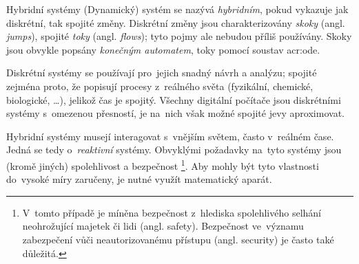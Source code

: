 \documentclass[thesis=M,czech]{FITthesis}[2012/06/26]
\newcommand{\acrlabel}[1]{acr:#1}
\newcommand{\acr}[1]{\acrshort{\acrlabel{#1}}}
\newcommand{\hl}[1]{\textit{#1}}
\newcommand{\name}[1]{\hl{#1}}
\newcommand{\rf}[1]{\ref{#1}}
\newcommand{\picFn}[1]{../img/#1}
\newcommand{\picL}{pic}
\newcommand{\rfPic}[1]{(\rf{\picL:#1})}
\newcommand{\pic}[5]{
\begin{figure}
{\centering
\texttt{[image: \\picFn\{\#1]}}
\caption{#4}
\label{\picL:#2}
}\smallskip
#5
\end{figure}
}
\begin{document}

\begin{section}{Hybridní systémy}\label{s:theory:hybrid}
(Dynamický) systém se nazývá \name{hybridním},
pokud vykazuje jak diskrétní, tak spojité změny.
Diskrétní změny jsou charakterizovány \name{skoky} (angl. \name{jumps}),
spojité \name{toky} (angl. \name{flows});
tyto pojmy ale nebudou příliš používány.
Skoky jsou obvykle popsány \name{konečným automatem},
toky pomocí soustav \acr{ode}.

Diskrétní systémy se používají pro~jejich snadný návrh a analýzu;
spojité zejména proto, že popisují procesy z~reálného světa
(fyzikální, chemické, biologické, \dots),
jelikož čas je spojitý.
Všechny digitální počítače jsou diskrétními systémy
s~omezenou přesností,
je na~nich však možné spojité jevy aproximovat.

Hybridní systémy musejí interagovat s~vnějším světem,
často v~reálném čase.
Jedná se tedy o~\name{reaktivní} systémy.
Obvyklými požadavky na~tyto systémy
jsou (kromě jiných) spolehlivost a bezpečnost%
\footnote{V~tomto případě je míněna
bezpečnost z~hlediska spolehlivého selhání
neohrožující majetek či lidi (angl. safety).
Bezpečnost ve~významu zabezpečení
vůči neautorizovanému přístupu (angl. security)
je často také důležitá.}.
Aby mohly být tyto vlastnosti do~vysoké míry zaručeny,
je nutné využít matematický aparát.


\end{section}
\end{document}
